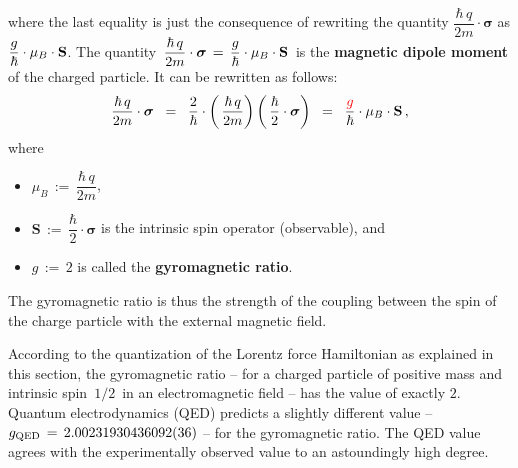 where the last equality is just the consequence of rewriting the quantity
\;$
\dfrac{\hbar\,q}{2m}\cdot\boldsymbol{\sigma}
$\;
as
\;$
\dfrac{{\color{black}g}}{\hbar}
\cdot
\mu_{B}
\cdot
\mathbf{S}
$.\;
The quantity
\,$
\dfrac{\hbar\,q}{2m}\cdot\boldsymbol{\sigma}
\, = \,
    \dfrac{{\color{black}g}}{\hbar}
    \cdot
    \mu_{B}
    \cdot
    \mathbf{S}
$\,
is the \textbf{magnetic dipole moment} of the charged particle.
It can be rewritten as follows:
\begin{equation*}
\dfrac{\hbar\,q}{2m}\cdot\boldsymbol{\sigma}
\;\; = \;\;
    \dfrac{2}{\hbar}
    \cdot
    \left(\,\dfrac{\hbar\,q}{2m}\right)
    \left(\,\dfrac{\hbar}{2}\cdot\boldsymbol{\sigma}\right)
\;\; = \;\;
    \dfrac{{\color{red}g}}{\hbar}
    \cdot
    \mu_{B}
    \cdot
    \mathbf{S}\,,
\end{equation*}
where
\begin{itemize}
\item
    $\mu_{B} \, := \, \dfrac{\hbar\,q}{2m}$,\;
\item
    $\mathbf{S} \, := \, \dfrac{\hbar}{2}\cdot\boldsymbol{\sigma}$\;
    is the intrinsic spin operator (observable), and
\item
    $g \, := \, 2$\; is called the \textbf{gyromagnetic ratio}.
\end{itemize}
The gyromagnetic ratio is thus the strength of the coupling
between the spin of the charge particle with the external magnetic field.

\begin{remark}
\mbox{}
\vskip 0.1cm
\noindent
According to the quantization of the Lorentz force Hamiltonian as explained in this section,
the gyromagnetic ratio
-- for a charged particle of positive mass and intrinsic spin \,$1/2$\, in an electromagnetic field --
has the value of exactly $2$.
Quantum electrodynamics (QED) predicts a slightly different value --
{\color{red}$g_{\textnormal{QED}} \,=\, 2.00231930436092(36)$}
-- for the gyromagnetic ratio.
The QED value agrees with the experimentally observed value
to an astoundingly high degree.
\end{remark}

